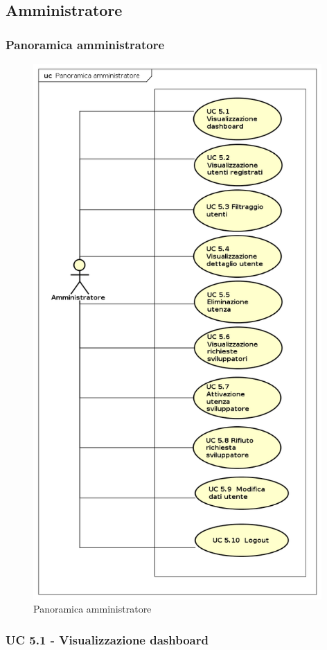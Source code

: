 \subsection{Amministratore}

\subsubsection{Panoramica amministratore}
\begin{figure}[H]
\centering
\includegraphics[width=11cm, keepaspectratio]{img/PanoramicaAmministratore.png} 
\caption{Panoramica amministratore}
\end{figure}


\subsubsection{UC 5.1 - Visualizzazione dashboard}

